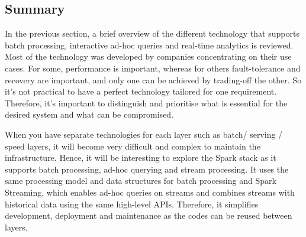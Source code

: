 \subsection{Summary} \label{subsec-lr-tech-summ}
In the previous section, a brief overview of the different technology that supports batch processing, interactive ad-hoc queries and real-time analytics is reviewed. Most of the technology was developed by companies concentrating on their use cases. For some, performance is important, whereas for others fault-tolerance and recovery are important, and only one can be achieved by trading-off the other. So it’s not practical to have a perfect technology tailored for one requirement. Therefore, it’s important to distinguish and prioritise what is essential for the desired system and what can be compromised. 

When you have separate technologies for each layer such as batch/ serving / speed layers, it will become very difficult and complex to maintain the infrastructure. Hence, it will be interesting to explore the Spark stack as it supports batch processing, ad-hoc querying and stream processing. It uses the same processing model and data structures for batch processing and Spark Streaming, which enables ad-hoc queries on streams and combines streams with historical data using the same high-level APIs. Therefore, it simplifies development, deployment and maintenance as the codes can be reused between layers.

